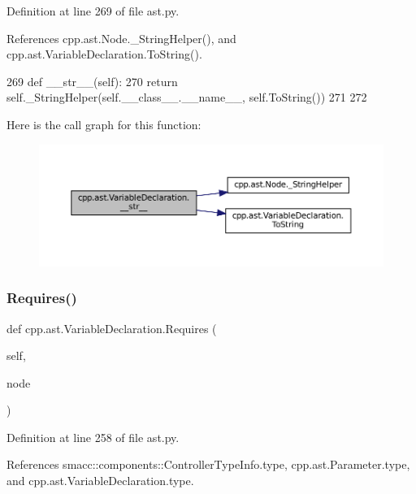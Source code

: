 Definition at line 269 of file ast.\+py.



References cpp.\+ast.\+Node.\+\_\+\+String\+Helper(), and cpp.\+ast.\+Variable\+Declaration.\+To\+String().


\begin{DoxyCode}
269     \textcolor{keyword}{def }\_\_str\_\_(self):
270         \textcolor{keywordflow}{return} self.\_StringHelper(self.\_\_class\_\_.\_\_name\_\_, self.ToString())
271 
272 
\end{DoxyCode}
Here is the call graph for this function\+:
\nopagebreak
\begin{figure}[H]
\begin{center}
\leavevmode
\includegraphics[width=350pt]{classcpp_1_1ast_1_1VariableDeclaration_a9f5c15731d1bdd8fe14c2a575e2f4fe6_cgraph}
\end{center}
\end{figure}
\mbox{\label{classcpp_1_1ast_1_1VariableDeclaration_aaa1cae7cf191e6d561d861cd053a0bf4}} 
\subsubsection{\texorpdfstring{Requires()}{Requires()}}
{\footnotesize\ttfamily def cpp.\+ast.\+Variable\+Declaration.\+Requires (\begin{DoxyParamCaption}\item[{}]{self,  }\item[{}]{node }\end{DoxyParamCaption})}



Definition at line 258 of file ast.\+py.



References smacc\+::components\+::\+Controller\+Type\+Info.\+type, cpp.\+ast.\+Parameter.\+type, and cpp.\+ast.\+Variable\+Declaration.\+type.


